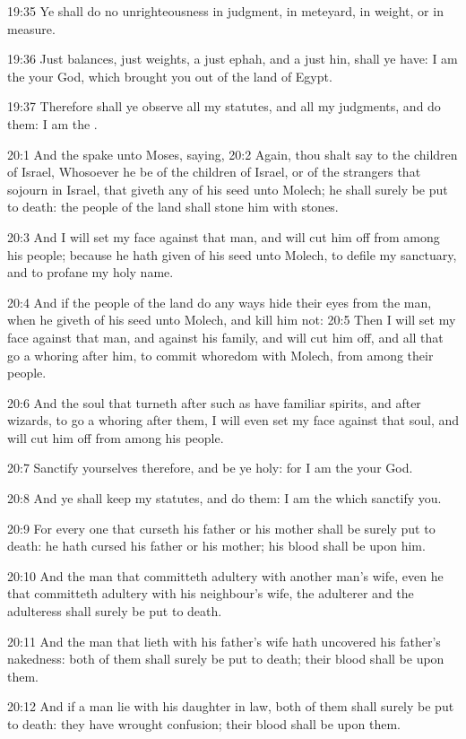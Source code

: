 19:35 Ye shall do no unrighteousness in judgment, in meteyard, in
weight, or in measure.

19:36 Just balances, just weights, a just ephah, and a just hin, shall
ye have: I am the \LORD your God, which brought you out of the land of
Egypt.

19:37 Therefore shall ye observe all my statutes, and all my
judgments, and do them: I am the \LORD.

20:1 And the \LORD spake unto Moses, saying, 20:2 Again, thou shalt say
to the children of Israel, Whosoever he be of the children of Israel,
or of the strangers that sojourn in Israel, that giveth any of his
seed unto Molech; he shall surely be put to death: the people of the
land shall stone him with stones.

20:3 And I will set my face against that man, and will cut him off
from among his people; because he hath given of his seed unto Molech,
to defile my sanctuary, and to profane my holy name.

20:4 And if the people of the land do any ways hide their eyes from
the man, when he giveth of his seed unto Molech, and kill him not:
20:5 Then I will set my face against that man, and against his family,
and will cut him off, and all that go a whoring after him, to commit
whoredom with Molech, from among their people.

20:6 And the soul that turneth after such as have familiar spirits,
and after wizards, to go a whoring after them, I will even set my face
against that soul, and will cut him off from among his people.

20:7 Sanctify yourselves therefore, and be ye holy: for I am the \LORD
your God.

20:8 And ye shall keep my statutes, and do them: I am the \LORD which
sanctify you.

20:9 For every one that curseth his father or his mother shall be
surely put to death: he hath cursed his father or his mother; his
blood shall be upon him.

20:10 And the man that committeth adultery with another man's wife,
even he that committeth adultery with his neighbour's wife, the
adulterer and the adulteress shall surely be put to death.

20:11 And the man that lieth with his father's wife hath uncovered his
father's nakedness: both of them shall surely be put to death; their
blood shall be upon them.

20:12 And if a man lie with his daughter in law, both of them shall
surely be put to death: they have wrought confusion; their blood shall
be upon them.

